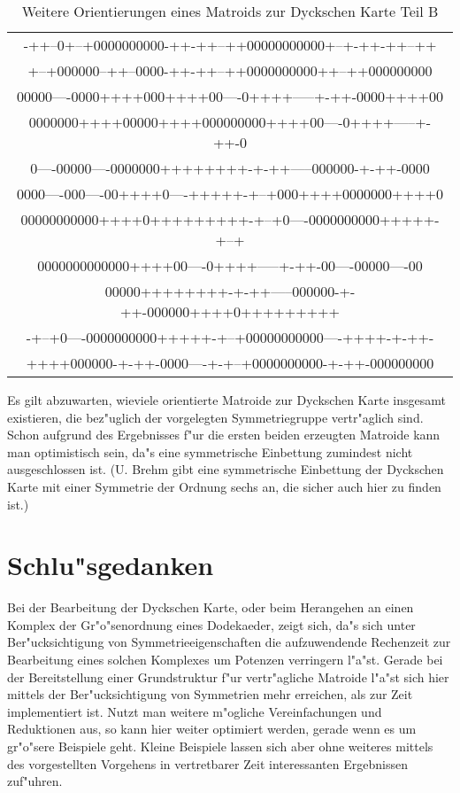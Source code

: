\begin{table}
{\begin{center}
\begin{tabular}{c}
-++--0+--+0000000000-++-++--++00000000000+--+-++-++--++\\
+--+000000--++--0000-++-++--++0000000000++--++000000000\\[2mm]
00000----0000++++000++++00----0++++-----+-++-0000++++00\\
0000000++++00000++++000000000++++00----0++++-----+-++-0\\
0----00000----0000000++++++++-+-++-----000000-+-++-0000\\
0000----000----00++++0----+++++-+--+000++++0000000++++0\\
00000000000++++0+++++++++-+--+0----0000000000+++++-+--+\\
0000000000000++++00----0++++-----+-++-00----00000----00\\
00000++++++++-+-++-----000000-+-++-000000++++0+++++++++\\
-+--+0----0000000000+++++-+--+00000000000----++++-+-++-\\
++++000000-+-++-0000----+-+--+0000000000-+-++-000000000
\end{tabular}
\end{center}
}
\caption{\label{dyckori2B}Weitere Orientierungen eines Matroids zur Dyckschen
         Karte Teil B}
\end{table}

Es gilt abzuwarten, wieviele orientierte Matroide zur Dyckschen Karte
insgesamt existieren, die bez"uglich der vorgelegten Symmetriegruppe
vertr"aglich sind. Schon aufgrund des Ergebnisses f"ur die ersten beiden
erzeugten Matroide kann man optimistisch sein, da"s eine symmetrische
Einbettung zumindest nicht ausgeschlossen ist. (U. Brehm gibt eine symmetrische
Einbettung der Dyckschen Karte mit einer Symmetrie der Ordnung sechs an, die
sicher auch hier zu finden ist.)

\clearpage
\section{Schlu"sgedanken}

Bei der Bearbeitung der Dyckschen Karte, oder beim Herangehen an einen
Komplex der Gr"o"senordnung eines Dodekaeder, zeigt sich, da"s sich unter
Ber"ucksichtigung von Symmetrieeigenschaften die aufzuwendende Rechenzeit
zur Bearbeitung eines solchen Komplexes um Potenzen verringern l"a"st.
Gerade bei der Bereitstellung einer Grundstruktur f"ur vertr"agliche Matroide
l"a"st sich hier mittels der Ber"ucksichtigung von Symmetrien mehr erreichen,
als zur Zeit implementiert ist. Nutzt man weitere m"ogliche Vereinfachungen und
Reduktionen aus, so kann hier weiter optimiert werden, gerade wenn es um
gr"o"sere Beispiele geht.
Kleine Beispiele lassen sich aber ohne weiteres mittels des vorgestellten
Vorgehens in vertretbarer Zeit interessanten Ergebnissen zuf"uhren.

